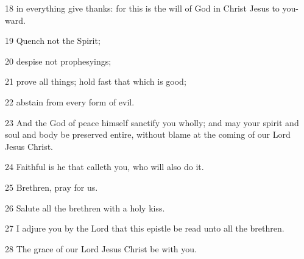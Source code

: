 \par 18 in everything give thanks: for this is the will of God in Christ Jesus to you-ward.
\par 19 Quench not the Spirit;
\par 20 despise not prophesyings;
\par 21 prove all things; hold fast that which is good;
\par 22 abstain from every form of evil.
\par 23 And the God of peace himself sanctify you wholly; and may your spirit and soul and body be preserved entire, without blame at the coming of our Lord Jesus Christ.
\par 24 Faithful is he that calleth you, who will also do it.
\par 25 Brethren, pray for us.
\par 26 Salute all the brethren with a holy kiss.
\par 27 I adjure you by the Lord that this epistle be read unto all the brethren.
\par 28 The grace of our Lord Jesus Christ be with you.

